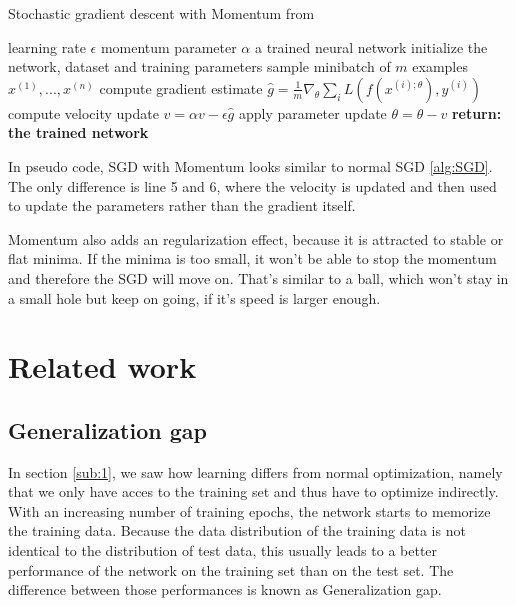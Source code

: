 \begin{algorithm}
    \begin{algorithmic}[1]
        \caption{Stochastic gradient descent with Momentum from \cite{Goodfellow-et-al-2016}}
        \REQUIRE learning rate $\epsilon$
        \REQUIRE momentum parameter $\alpha$
        \ENSURE a trained neural network
        \STATE initialize the network, dataset and training parameters
            \STATE sample minibatch of $m$ examples ${x^{(1)}, ... ,x^{(n)}}$
            \STATE compute gradient estimate $\hat{g}=\frac{1}{m} \nabla_\theta \sum_i L(f(x^{(i);\theta}),y^{(i)})$
            \STATE compute velocity update $v=\alpha v - \epsilon \hat{g}$
            \STATE apply parameter update $\theta=\theta-v$
        \ENDWHILE
        \STATE \textbf{return: the trained network}
    \end{algorithmic}
\end{algorithm}

In pseudo code, SGD with Momentum looks similar to normal SGD \ref{alg:SGD}. The
only difference is line 5 and 6, where the velocity is updated and then used to
update the parameters rather than the gradient itself.


Momentum also adds an regularization effect, because it is attracted to stable
or flat minima. If the minima is too small, it won't be able to stop the
momentum and therefore the SGD will move on. That's similar to a ball, which
won't stay in a small hole but keep on going, if it's speed is larger enough.






\section{Related work}
\subsection{Generalization gap}\label{sub:Generalization}
In section \ref{sub:1}, we saw how learning differs from normal optimization,
namely that we only have acces to the training set and thus have to optimize
indirectly. With an increasing number of training epochs, the network starts to
memorize the training data. Because the data distribution of the training data
is not identical to the distribution of test data, this usually leads to a
better performance of the network on the training set than on the test set. The
difference between those performances is known as Generalization gap. 

